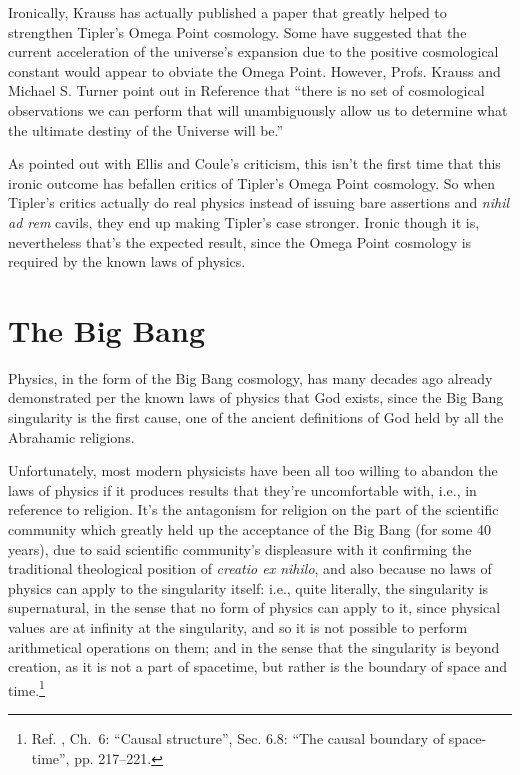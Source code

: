\documentclass[letterpaper,12pt]{article}
\begin{document}
Ironically, Krauss has actually published a paper that greatly helped to strengthen Tipler's Omega Point cosmology. Some have suggested that the current acceleration of the universe's expansion due to the positive cosmological constant would appear to obviate the Omega Point. However, Profs. Krauss and Michael S. Turner point out in Reference  that ``there is no set of cosmological observations we can perform that will unambiguously allow us to determine what the ultimate destiny of the Universe will be.''

As pointed out with Ellis and Coule's criticism, this isn't the first time that this ironic outcome has befallen critics of Tipler's Omega Point cosmology. So when Tipler's critics actually do real physics instead of issuing bare assertions and \emph{nihil ad rem} cavils, they end up making Tipler's case stronger. Ironic though it is, nevertheless that's the expected result, since the Omega Point cosmology is required by the known laws of physics.

\section{The Big Bang}
\label{sec:BigBang}

Physics, in the form of the Big Bang cosmology, has many decades ago already demonstrated per the known laws of physics that God exists, since the Big Bang singularity is the first cause, one of the ancient definitions of God held by all the Abrahamic religions.

Unfortunately, most modern physicists have been all too willing to abandon the laws of physics if it produces results that they're uncomfortable with, i.e., in reference to religion. It's the antagonism for religion on the part of the scientific community which greatly held up the acceptance of the Big Bang (for some 40 years), due to said scientific community's displeasure with it confirming the traditional theological position of \emph{creatio ex nihilo}, and also because no laws of physics can apply to the singularity itself: i.e., quite literally, the singularity is \gls{supernatural}, in the sense that no form of physics can apply to it, since physical values are at infinity at the singularity, and so it is not possible to perform arithmetical operations on them; and in the sense that the singularity is beyond creation, as it is not a part of spacetime, but rather is the boundary of space and time.\footnote{Ref. , Ch.~6: ``Causal structure'', Sec. 6.8: ``The causal boundary of space-time'', pp. 217--221.}
\end{document}

